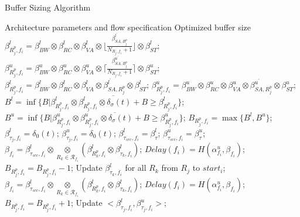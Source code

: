 \documentclass[10pt,journal]{IEEEtran}
\begin{document}
\begin{algorithm}
\caption{Buffer Sizing Algorithm}
\label{alg:bufopt}
\begin{algorithmic}[1]
\REQUIRE Architecture parameters and flow specification
\ENSURE Optimized buffer size
                \STATE $\beta_{R_j^{p},f_i}^l=\beta_{BW}^l\otimes\beta_{RC}^l\otimes\beta_{VA}^l\otimes\lfloor\frac{\beta_{SA,R_j^{p}}^{l^\prime}}{N_{R_j,f_i}+1}\rfloor\otimes\beta_{ST}^l$;
                \STATE $\beta_{R_j^{p},f_i}^u=\beta_{BW}^u\otimes\beta_{RC}^u\otimes\beta_{VA}^u\otimes\lceil\frac{\beta_{SA,R_j^{p}}^{u^\prime}}{N_{R_j,f_i}+1}\rceil\otimes\beta_{ST}^u$;
            \ELSE
                \STATE $\beta_{R_j^{p},f_i}^l=\beta_{BW}^l\otimes\beta_{RC}^l\otimes\beta_{VA}^l\otimes\beta_{SA,R_j^{p}}^{l^\prime}\otimes\beta_{ST}^l$;
                \STATE $\beta_{R_j^{p},f_i}^u=\beta_{BW}^u\otimes\beta_{RC}^u\otimes\beta_{VA}^u\otimes\beta_{SA,R_j^{p}}^{u^\prime}\otimes\beta_{ST}^u$;
            \ENDIF
            \STATE $B^l=\inf\{B|\beta_{R_j^{p},f_i}^l\otimes\overline{\beta_{R_j^{p},f_i}^l\otimes\delta_\sigma(t)+B}\geq\beta_{R_j^{p},f_i}^l\}$;
            \STATE $B^u=\inf\{B|\beta_{R_j^{p},f_i}^u\otimes\overline{\beta_{R_j^{p},f_i}^u\otimes\delta_\sigma(t)+B}\geq\beta_{R_j^{p},f_i}^u\}$;
            \STATE $B_{R_j^{p},f_i}=\max\{B^l,B^u\}$;
            \STATE $\beta_{\tau_j,f_i}^l=\delta_0(t)$; $\beta_{\tau_j,f_i}^u=\delta_0(t)$;
        \ENDFOR
        \STATE $\beta_{\tau_{src},f_i}^l=\beta^l_{\tau}$; $\beta_{\tau_{src},f_i}^u=\beta^u_{\tau}$;
            \STATE $\beta_{f_i}=\beta_{\tau_{src},f_i}^l\otimes\underset{R_k\in\mathcal{R}_{f_i}}{\otimes}(\beta^l_{R_k^p,f_i}\otimes\beta^l_{\tau_k,f_i})$;
            \STATE $Delay(f_i)=H(\alpha^u_{f_i},\beta_{f_i})$;
                \STATE $B_{R_j^p,f_i}=B_{R_j^p,f_i}-1$;
                \STATE Update $\beta_{\tau_k,f_i}^l$ for all $R_{k}$ from $R_j$ to $start_i$;
                \STATE $\beta_{f_i}=\beta_{\tau_{src},f_i}^l\otimes\underset{R_k\in\mathcal{R}_{f_i}}{\otimes}(\beta^l_{R_k^p,f_i}\otimes\beta^l_{\tau_k,f_i})$;
                \STATE $Delay(f_i)=H(\alpha^u_{f_i},\beta_{f_i})$;
            \ENDWHILE
                \STATE $B_{R_j^p,f_i}=B_{R_j^p,f_i}+1$;
                \STATE Update $<\beta_{\tau_j,f_i}^l,\beta_{\tau_j,f_i}^u>$;

\end{algorithmic}
\end{algorithm}
\end{document}
